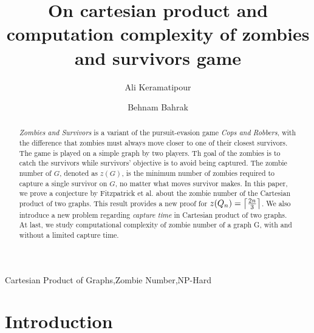 \documentclass[1p]{elsarticle}
\DeclarePairedDelimiter\ceil{\lceil}{\rceil} \DeclarePairedDelimiter\floor{\lfloor}{\rfloor}
\begin{document}
	
	\begin{frontmatter}
		
		\title{On cartesian product and computation complexity of zombies and survivors game}
		
		
		\author{Ali Keramatipour}
		
		\author{Behnam Bahrak}
		
		\address{School of Electrical and Computer Engineering, College of Engineering, University of Tehran, Tehran, Iran}
		
		\begin{abstract}
		{\it Zombies and Survivors} is a variant of the pursuit-evasion game {\it Cops and Robbers}, with the difference
		that zombies must always move closer to one of their closest survivors. The game is played on a simple graph by
		two players. Th goal of the zombies is to catch the survivors while survivors' objective is to avoid being
		captured. The zombie number of $G$, denoted as $z(G)$, is the minimum number of zombies required to capture a
		single survivor on $G$, no matter what moves survivor makes. In this paper, we prove a conjecture by Fitzpatrick
		et al.\cite{Fitz16} about the zombie number of the Cartesian product of two graphs. This result provides a new
		proof for $z(Q_n) = \ceil*{\frac{2n}{3}}$. We also introduce a new problem regarding {\it capture time} in
		Cartesian product of two graphs. At last, we study computational complexity of zombie number of a graph G, with
		and without a limited capture time.
		\end{abstract}
		
		\begin{keyword}
			Cartesian Product of Graphs\sep Zombie Number\sep NP-Hard
		\end{keyword}
		
	\end{frontmatter}
	
\section{Introduction}\label{section-introduction}
\end{document}
